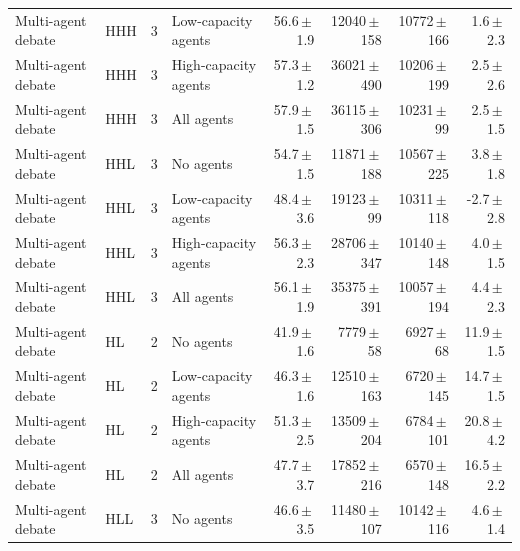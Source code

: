 \begin{table}[htbp]
\begin{tabular}{llclrrrr}
Multi-agent debate & HHH & 3 & Low-capacity agents & 56.6{\scriptsize\,$\pm$\,1.9} & 12040{\scriptsize\,$\pm$\,158} & 10772{\scriptsize\,$\pm$\,166} & 1.6{\scriptsize\,$\pm$\,2.3} \\
Multi-agent debate & HHH & 3 & High-capacity agents & 57.3{\scriptsize\,$\pm$\,1.2} & 36021{\scriptsize\,$\pm$\,490} & 10206{\scriptsize\,$\pm$\,199} & 2.5{\scriptsize\,$\pm$\,2.6} \\
Multi-agent debate & HHH & 3 & All agents & 57.9{\scriptsize\,$\pm$\,1.5} & 36115{\scriptsize\,$\pm$\,306} & 10231{\scriptsize\,$\pm$\,99} & 2.5{\scriptsize\,$\pm$\,1.5} \\
Multi-agent debate & HHL & 3 & No agents & 54.7{\scriptsize\,$\pm$\,1.5} & 11871{\scriptsize\,$\pm$\,188} & 10567{\scriptsize\,$\pm$\,225} & 3.8{\scriptsize\,$\pm$\,1.8} \\
Multi-agent debate & HHL & 3 & Low-capacity agents & 48.4{\scriptsize\,$\pm$\,3.6} & 19123{\scriptsize\,$\pm$\,99} & 10311{\scriptsize\,$\pm$\,118} & -2.7{\scriptsize\,$\pm$\,2.8} \\
Multi-agent debate & HHL & 3 & High-capacity agents & 56.3{\scriptsize\,$\pm$\,2.3} & 28706{\scriptsize\,$\pm$\,347} & 10140{\scriptsize\,$\pm$\,148} & 4.0{\scriptsize\,$\pm$\,1.5} \\
Multi-agent debate & HHL & 3 & All agents & 56.1{\scriptsize\,$\pm$\,1.9} & 35375{\scriptsize\,$\pm$\,391} & 10057{\scriptsize\,$\pm$\,194} & 4.4{\scriptsize\,$\pm$\,2.3} \\
Multi-agent debate & HL & 2 & No agents & 41.9{\scriptsize\,$\pm$\,1.6} & 7779{\scriptsize\,$\pm$\,58} & 6927{\scriptsize\,$\pm$\,68} & 11.9{\scriptsize\,$\pm$\,1.5} \\
Multi-agent debate & HL & 2 & Low-capacity agents & 46.3{\scriptsize\,$\pm$\,1.6} & 12510{\scriptsize\,$\pm$\,163} & 6720{\scriptsize\,$\pm$\,145} & 14.7{\scriptsize\,$\pm$\,1.5} \\
Multi-agent debate & HL & 2 & High-capacity agents & 51.3{\scriptsize\,$\pm$\,2.5} & 13509{\scriptsize\,$\pm$\,204} & 6784{\scriptsize\,$\pm$\,101} & 20.8{\scriptsize\,$\pm$\,4.2} \\
Multi-agent debate & HL & 2 & All agents & 47.7{\scriptsize\,$\pm$\,3.7} & 17852{\scriptsize\,$\pm$\,216} & 6570{\scriptsize\,$\pm$\,148} & 16.5{\scriptsize\,$\pm$\,2.2} \\
Multi-agent debate & HLL & 3 & No agents & 46.6{\scriptsize\,$\pm$\,3.5} & 11480{\scriptsize\,$\pm$\,107} & 10142{\scriptsize\,$\pm$\,116} & 4.6{\scriptsize\,$\pm$\,1.4} \\

\end{tabular}
\end{table}
